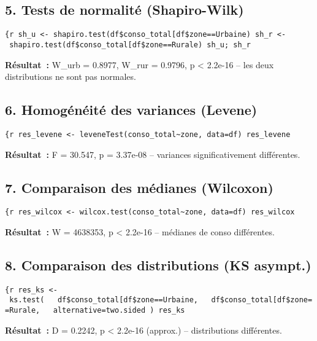 \documentclass[
]{article}
\begin{document}
\subsection{5. Tests de normalité
(Shapiro-Wilk)}\label{tests-de-normalituxe9-shapiro-wilk}

\texttt{\{r\ sh\_u\ \textless{}-\ shapiro.test(df\$conso\_total{[}df\$zone==\textquotesingle{}Urbaine\textquotesingle{}{]})\ sh\_r\ \textless{}-\ shapiro.test(df\$conso\_total{[}df\$zone==\textquotesingle{}Rurale\textquotesingle{}{]})\ sh\_u;\ sh\_r}

\textbf{Résultat~:} W\_urb = 0.8977, W\_rur = 0.9796, p \textless{}
2.2e-16 -- les deux distributions ne sont pas normales.

\subsection{6. Homogénéité des variances
(Levene)}\label{homoguxe9nuxe9ituxe9-des-variances-levene}

\texttt{\{r\ res\_levene\ \textless{}-\ leveneTest(conso\_total\textasciitilde{}zone,\ data=df)\ res\_levene}

\textbf{Résultat~:} F = 30.547, p = 3.37e-08 -- variances
significativement différentes.

\subsection{7. Comparaison des médianes
(Wilcoxon)}\label{comparaison-des-muxe9dianes-wilcoxon}

\texttt{\{r\ res\_wilcox\ \textless{}-\ wilcox.test(conso\_total\textasciitilde{}zone,\ data=df)\ res\_wilcox}

\textbf{Résultat~:} W = 4638353, p \textless{} 2.2e-16 -- médianes de
conso différentes.

\subsection{8. Comparaison des distributions (KS
asympt.)}\label{comparaison-des-distributions-ks-asympt.}

\texttt{\{r\ res\_ks\ \textless{}-\ ks.test(\ \ \ df\$conso\_total{[}df\$zone==\textquotesingle{}Urbaine\textquotesingle{}{]},\ \ \ df\$conso\_total{[}df\$zone==\textquotesingle{}Rurale\textquotesingle{}{]},\ \ \ alternative=\textquotesingle{}two.sided\textquotesingle{}\ )\ res\_ks}

\textbf{Résultat~:} D = 0.2242, p \textless{} 2.2e-16 (approx.) --
distributions différentes.
\end{document}
